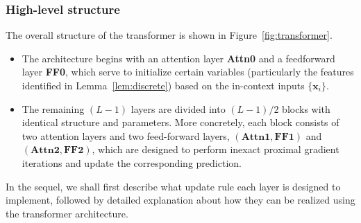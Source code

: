 \documentclass[english]{article}
\begin{document}
 


\subsubsection{High-level structure}
The overall structure of the transformer is shown in Figure~\ref{fig:transformer}.
%
\begin{itemize}
\item The architecture begins with an attention layer \textbf{Attn0} and a feedforward layer \textbf{FF0}, which serve to initialize certain variables (particularly the features identified in Lemma~\ref{lem:discrete}) based on the in-context inputs $\{{\bm x}_i\}$.

\item 
The remaining $(L-1)$ layers are divided into $(L-1)/2$ blocks with identical structure and parameters.
More concretely, each block consists of two attention layers and two feed-forward layers, $(\textbf{Attn1}, \textbf{FF1})$ and $(\textbf{Attn2}, \textbf{FF2})$,
which are designed to perform inexact proximal gradient iterations and update the corresponding  prediction. 
\end{itemize}

\noindent 
In the sequel, we shall first describe what update rule each layer is designed to implement, followed by detailed explanation about how they can be realized using the transformer architecture. 
\end{document}
